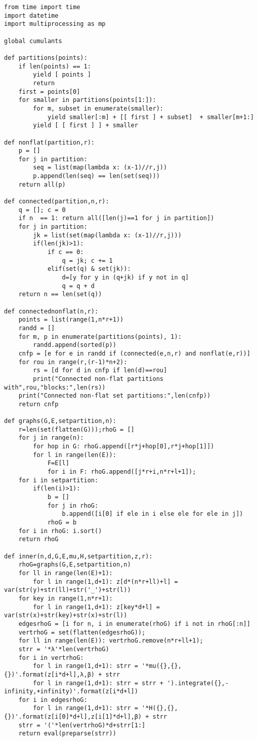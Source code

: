\documentclass[12pt]{article}
\numberwithin{equation}{section}
\begin{document}
\begin{lstlisting}
from time import time
import datetime
import multiprocessing as mp

global cumulants

def partitions(points):
    if len(points) == 1:
        yield [ points ]
        return
    first = points[0]
    for smaller in partitions(points[1:]):
        for m, subset in enumerate(smaller):
            yield smaller[:m] + [[ first ] + subset]  + smaller[m+1:]
        yield [ [ first ] ] + smaller

def nonflat(partition,r):
    p = []
    for j in partition:    
        seq = list(map(lambda x: (x-1)//r,j))
        p.append(len(seq) == len(set(seq)))
    return all(p)

def connected(partition,n,r):
    q = []; c = 0
    if n  == 1: return all([len(j)==1 for j in partition])
    for j in partition:
        jk = list(set(map(lambda x: (x-1)//r,j)))
        if(len(jk)>1):            
            if c == 0:
                q = jk; c += 1
            elif(set(q) & set(jk)):
                d=[y for y in (q+jk) if y not in q]
                q = q + d
    return n == len(set(q))

def connectednonflat(n,r):
    points = list(range(1,n*r+1))
    randd = []
    for m, p in enumerate(partitions(points), 1):
        randd.append(sorted(p))
    cnfp = [e for e in randd if (connected(e,n,r) and nonflat(e,r))]
    for rou in range(r,(r-1)*n+2): 
        rs = [d for d in cnfp if len(d)==rou]
        print("Connected non-flat partitions with",rou,"blocks:",len(rs))
    print("Connected non-flat set partitions:",len(cnfp))
    return cnfp

def graphs(G,E,setpartition,n):
    r=len(set(flatten(G)));rhoG = []
    for j in range(n):
        for hop in G: rhoG.append([r*j+hop[0],r*j+hop[1]])
        for l in range(len(E)):
            F=E[l]
            for i in F: rhoG.append([j*r+i,n*r+l+1]);
    for i in setpartition:
        if(len(i)>1):
            b = []
            for j in rhoG:
                b.append([i[0] if ele in i else ele for ele in j])
            rhoG = b
    for i in rhoG: i.sort()
    return rhoG

def inner(n,d,G,E,mu,H,setpartition,z,r):
    rhoG=graphs(G,E,setpartition,n)
    for ll in range(len(E)+1):
        for l in range(1,d+1): z[d*(n*r+ll)+l] = var(str(y)+str(ll)+str('_')+str(l))
    for key in range(1,n*r+1): 
        for l in range(1,d+1): z[key*d+l] = var(str(x)+str(key)+str(x)+str(l))
    edgesrhoG = [i for n, i in enumerate(rhoG) if i not in rhoG[:n]]
    vertrhoG = set(flatten(edgesrhoG));
    for ll in range(len(E)): vertrhoG.remove(n*r+ll+1);
    strr = '*λ'*len(vertrhoG)
    for i in vertrhoG:
        for l in range(1,d+1): strr = '*mu({},{},{})'.format(z[i*d+l],λ,β) + strr
        for l in range(1,d+1): strr = strr + ').integrate({},-infinity,+infinity)'.format(z[i*d+l])
    for i in edgesrhoG:
        for l in range(1,d+1): strr = '*H({},{},{})'.format(z[i[0]*d+l],z[i[1]*d+l],β) + strr
    strr = '('*len(vertrhoG)*d+strr[1:]
    return eval(preparse(strr))


\end{lstlisting}
\end{document}
